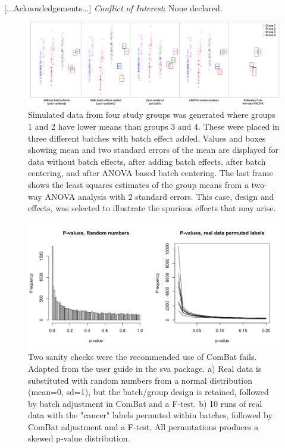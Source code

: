 \documentclass{bio}
\begin{document}
[...Acknowledgements...]
{\it Conflict of Interest}: None declared.




%



\begin{figure}[!p]
\centering\includegraphics[width=13cm]{Fig/boxplots.png}
\caption{Simulated data from four study groups was generated where groups 1 and 2 have lower means than groups 3 and 4. These were placed in three different batches with batch effect added. Values and boxes showing mean and two standard errors of the mean are displayed for data without batch effects, after adding batch effects, after batch centering, and after ANOVA based batch centering. The last frame shows the least squares estimates of the group means from a two-way ANOVA analysis with 2 standard errors. This case, design and effects, was selected to illustrate the spurious effects that may arise.}
\label{fig:boxplots}
\end{figure}


\begin{figure}[!p]
\centering\includegraphics[width=13cm]{Fig/pvaluesleeksva.png}
\caption{
Two sanity checks were the recommended use of ComBat fails. Adapted from the user guide in the sva package. 
a) Real data is substituted with random numbers from a normal distribution (mean=0, sd=1), but the batch/group design is retained, followed by batch adjustment in ComBat and a F-test.
b) 10 runs of real data with the "cancer" labels permuted within batches, followed by ComBat adjustment and a F-test. All permutations produces a skewed p-value distribution.
}
\label{fig:p-sva}
\end{figure}
\end{document}
